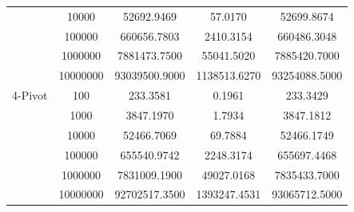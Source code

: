 \documentclass{article}
\begin{document}
\begin{center}
\begin{tabular}{ |c c | c c c| }
                        & 10000    & 52692.9469     & 57.0170       & 52699.8674 \\
                        & 100000   & 660656.7803    & 2410.3154     & 660486.3048 \\
                        & 1000000  & 7881473.7500   & 55041.5020    & 7885420.7000 \\
                        & 10000000 & 93039500.9000  & 1138513.6270  & 93254088.5000 \\
        \hline
        4-Pivot         & 100      & 233.3581       & 0.1961        & 233.3429 \\
                        & 1000     & 3847.1970      & 1.7934        & 3847.1812 \\
                        & 10000    & 52466.7069     & 69.7884       & 52466.1749 \\
                        & 100000   & 655540.9742    & 2248.3174     & 655697.4468 \\
                        & 1000000  & 7831009.1900   & 49027.0168    & 7835433.7000 \\
                        & 10000000 & 92702517.3500  & 1393247.4531  & 93065712.5000 \\
        \hline
    \end{tabular}


\end{center}
\end{document}
